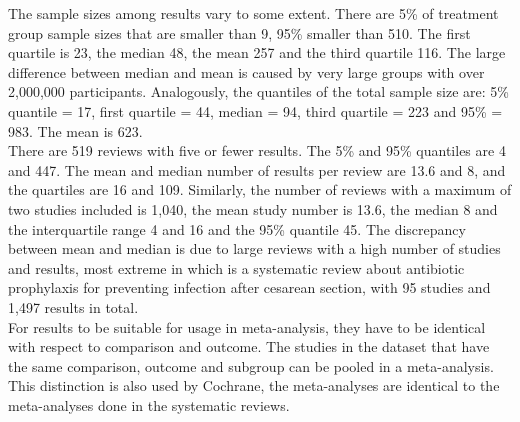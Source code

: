 \documentclass[11pt,a4paper,twoside]{book}\usepackage[]{graphicx}\usepackage[]{color}
\begin{document}
The sample sizes among results vary to some extent. There are 5\% of treatment group sample sizes that are smaller than 9, 95\% smaller than 510. The first quartile is 23, the median 48, the mean 257 and the third quartile 116. The large difference between median and mean is caused by very large groups with over 2,000,000 participants. Analogously, the quantiles of the total sample size are: 5\% quantile = 17, first quartile = 44, median = 94, third quartile = 223 and 95\% = 983. The mean is 623. \\
There are 519 reviews with five or fewer results. The 5\% and 95\% quantiles are 4 and 447. The mean and median number of results per review are 13.6 and 8, and the quartiles are 16 and 109. Similarly, the number of reviews with a maximum of two studies included is 1,040, the mean study number is 13.6, the median 8 and the interquartile range 4 and 16 and the 95\% quantile 45. The discrepancy between mean and median is due to large reviews with a high number of studies and results, most extreme in %
which is a systematic review about antibiotic prophylaxis for preventing infection after cesarean section, with 95 studies and 1,497 results in total.\\
For results to be suitable for usage in meta-analysis, they have to be identical with respect to comparison and outcome. The studies in the dataset that have the same comparison, outcome and subgroup can be pooled in a meta-analysis. This distinction is also used by Cochrane, \ie the meta-analyses are identical to the meta-analyses done in the systematic reviews.\\ %

% 
% 

% 
\end{document}
